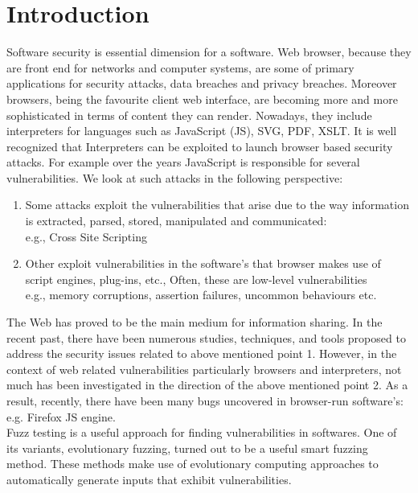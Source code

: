 \documentclass{sig-alternate}
\begin{document}
\section{Introduction}
\indent Software security is essential dimension for a software. Web browser, because they are front end for networks and computer systems, are some of primary applications for security attacks, data breaches and privacy breaches. Moreover browsers, being the favourite client web interface, are becoming more and more sophisticated in terms of content they can render. Nowadays, they include interpreters
for languages such as JavaScript (JS), SVG, PDF, XSLT. It is well recognized that Interpreters can be exploited to launch browser based security attacks. For example over the years JavaScript is responsible for several vulnerabilities. We look at such attacks in the following perspective:
\begin{enumerate}
\item Some attacks exploit the vulnerabilities that arise due to the way information is extracted, parsed, stored, manipulated and communicated:
\\e.g., Cross Site Scripting
\item Other exploit vulnerabilities in the software's that browser makes use of script engines, plug-ins, etc., Often, these are low-level vulnerabilities
\\e.g., memory corruptions, assertion failures, uncommon behaviours etc.
\end{enumerate}
\indent The Web has proved to be the main medium for information sharing. In the recent past, there have been numerous studies, techniques, and tools proposed to address the security issues related to above mentioned point 1. However, in the context of web related vulnerabilities particularly browsers and interpreters, not much has been investigated in the direction of the above mentioned point 2. As a result, recently, there have been many bugs uncovered in browser-run software's: e.g. Firefox JS engine.\\
\indent Fuzz testing is a useful approach for finding vulnerabilities in softwares. One of its variants, evolutionary fuzzing, turned out to be a useful smart fuzzing method. These methods make use of evolutionary computing approaches to automatically generate inputs that exhibit vulnerabilities.\\
\end{document}
